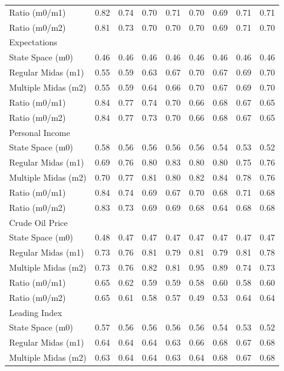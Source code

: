 \begin{table}[ht]
\begin{tabular}{lcccccccc}
Ratio (m0/m1) & 0.82 & 0.74 & 0.70 & 0.71 & 0.70 & 0.69 & 0.71 & 0.71 \\
Ratio (m0/m2) & 0.81 & 0.73 & 0.70 & 0.70 & 0.70 & 0.69 & 0.71 & 0.70 \\
\hline
Expectations &  &  &  &  &  &  &  &  \\
\hline
State Space (m0) & 0.46 & 0.46 & 0.46 & 0.46 & 0.46 & 0.46 & 0.46 & 0.46 \\
Regular Midas (m1) & 0.55 & 0.59 & 0.63 & 0.67 & 0.70 & 0.67 & 0.69 & 0.70 \\
Multiple Midas (m2) & 0.55 & 0.59 & 0.64 & 0.66 & 0.70 & 0.67 & 0.69 & 0.70 \\
Ratio (m0/m1) & 0.84 & 0.77 & 0.74 & 0.70 & 0.66 & 0.68 & 0.67 & 0.65 \\
Ratio (m0/m2) & 0.84 & 0.77 & 0.73 & 0.70 & 0.66 & 0.68 & 0.67 & 0.65 \\
\hline
Personal Income &  &  &  &  &  &  &  &  \\
\hline
State Space (m0) & 0.58 & 0.56 & 0.56 & 0.56 & 0.56 & 0.54 & 0.53 & 0.52 \\
Regular Midas (m1) & 0.69 & 0.76 & 0.80 & 0.83 & 0.80 & 0.80 & 0.75 & 0.76 \\
Multiple Midas (m2) & 0.70 & 0.77 & 0.81 & 0.80 & 0.82 & 0.84 & 0.78 & 0.76 \\
Ratio (m0/m1) & 0.84 & 0.74 & 0.69 & 0.67 & 0.70 & 0.68 & 0.71 & 0.68 \\
Ratio (m0/m2) & 0.83 & 0.73 & 0.69 & 0.69 & 0.68 & 0.64 & 0.68 & 0.68 \\
\hline
Crude Oil Price &  &  &  &  &  &  &  &  \\
\hline
State Space (m0) & 0.48 & 0.47 & 0.47 & 0.47 & 0.47 & 0.47 & 0.47 & 0.47 \\
Regular Midas (m1) & 0.73 & 0.76 & 0.81 & 0.79 & 0.81 & 0.79 & 0.81 & 0.78 \\
Multiple Midas (m2) & 0.73 & 0.76 & 0.82 & 0.81 & 0.95 & 0.89 & 0.74 & 0.73 \\
Ratio (m0/m1) & 0.65 & 0.62 & 0.59 & 0.59 & 0.58 & 0.60 & 0.58 & 0.60 \\
Ratio (m0/m2) & 0.65 & 0.61 & 0.58 & 0.57 & 0.49 & 0.53 & 0.64 & 0.64 \\
\hline
Leading Index &  &  &  &  &  &  &  &  \\
\hline
State Space (m0) & 0.57 & 0.56 & 0.56 & 0.56 & 0.56 & 0.54 & 0.53 & 0.52 \\
Regular Midas (m1) & 0.64 & 0.64 & 0.64 & 0.63 & 0.66 & 0.68 & 0.67 & 0.68 \\
Multiple Midas (m2) & 0.63 & 0.64 & 0.64 & 0.63 & 0.64 & 0.68 & 0.67 & 0.68 \\

\end{tabular}
\end{table}
